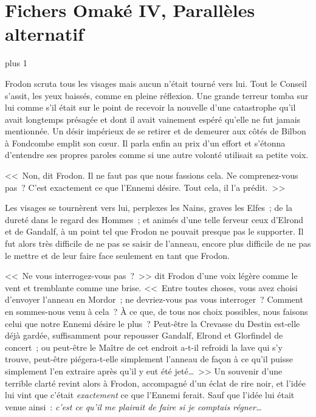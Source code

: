 
\makeatletter
\newcommand{\OmakeIVspecialsection}[2][1.5]{%
\vspace*{2\baselineskip plus 1\baselineskip minus 1\baselineskip}%
\noindent\hfill\scalebox{#1}{#2}\hfill\mbox{}%
\vskip 1\baselineskip plus 1\baselineskip%
\@afterindentfalse\@afterheading
}
\makeatother

\newcommand{\OmakeIVsection}[2][1.5]{%
  \OmakeIVspecialsection[#1]{\MakeUppercase{#2}}}

\chapter{Fichers Omaké IV, Parallèles alternatif}

\OmakeIVspecialsection[1.6]{\fontspec[ExternalLocation]{RingBearer}
\settowidth{\versewidth}{\mbox{Le}}
Seigneur\scalebox{.40}{\parbox[b]{\versewidth}{%
        \centering de\\\nointerlineskip\vskip 4pt la}}Rationalit\raisebox{-.32ex}{É}}

Frodon scruta tous les visages mais aucun n'était tourné vers lui. Tout le Conseil s'assit, les yeux baissés, comme en pleine réflexion. Une grande terreur tomba sur lui comme s'il était sur le point de recevoir la nouvelle d'une catastrophe qu'il avait longtemps présagée et dont il avait vainement espéré qu'elle ne fut jamais mentionnée. Un désir impérieux de se retirer et de demeurer aux côtés de Bilbon à Fondcombe emplit son cœur. Il parla enfin au prix d'un effort et s'étonna d'entendre ses propres paroles comme si une autre volonté utilisait sa petite voix.

<<~Non, dit Frodon. Il ne faut pas que nous fassions cela. Ne comprenez-vous pas~? C'est exactement ce que l'Ennemi désire. Tout cela, il l'a prédit.~>>

Les visages se tournèrent vers lui, perplexes les Nains, graves les Elfes~; de la dureté dans le regard des Hommes~; et animés d'une telle ferveur ceux d'Elrond et de Gandalf, à un point tel que Frodon ne pouvait presque pas le supporter. Il fut alors très difficile de ne pas se saisir de l'anneau, encore plus difficile de ne pas le mettre et de leur faire face seulement en tant que Frodon.

<<~Ne vous interrogez-vous pas~?~>> dit Frodon d'une voix légère comme le vent et tremblante comme une brise. <<~Entre toutes choses, vous avez choisi d'envoyer l'anneau en Mordor~; ne devriez-vous pas vous interroger~? Comment en sommes-nous venu à cela~? À ce que, de tous nos choix possibles, nous faisons celui que notre Ennemi désire le plus~? Peut-être la Crevasse du Destin est-elle déjà gardée, suffisamment pour repousser Gandalf, Elrond et Glorfindel de concert~; ou peut-être le Maître de cet endroit a-t-il refroidi la lave qui s'y trouve, peut-être piégera-t-elle simplement l'anneau de façon à ce qu'il puisse simplement l'en extraire après qu'il y eut été jeté…~>> Un souvenir d'une terrible clarté revint alors à Frodon, accompagné d'un éclat de rire noir, et l'idée lui vint que c'était \emph{exactement} ce que l'Ennemi ferait. Sauf que l'idée lui était venue ainsi~: \emph{c'est ce qu'il me plairait de faire si je comptais régner…}

